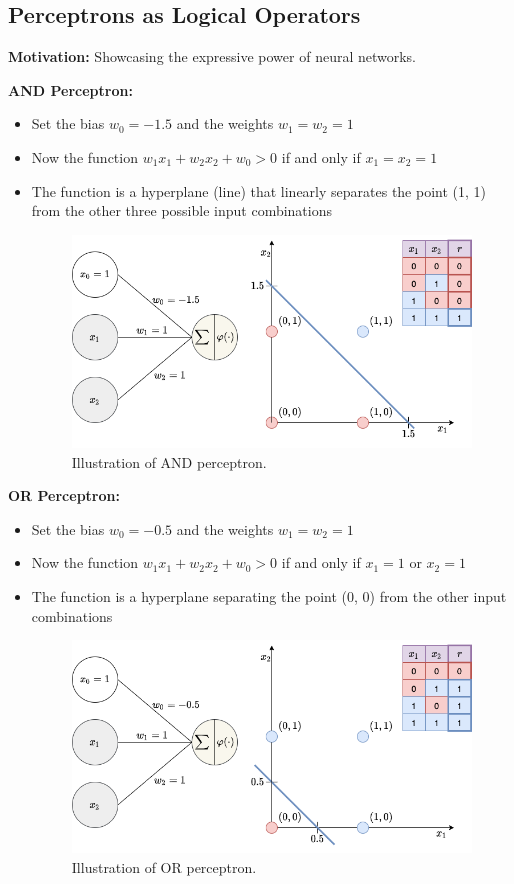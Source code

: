 \documentclass[12pt, a4paper]{article}
\begin{document}
\subsection{Perceptrons as Logical Operators}\label{Perceptrons-as-Logical-Operators}

\textbf{Motivation:} Showcasing the expressive power of neural networks.

\textbf{AND Perceptron:}
\begin{itemize}
  \item Set the bias $w_0 = -1.5$ and the weights $w_1 = w_2 = 1$
  \item Now the function $w_1x_1 + w_2x_2 + w_0 > 0$ if and only if $x_1 = x_2 = 1$
  \item The function is a hyperplane (line) that linearly separates the point (1, 1) from the other three possible input combinations
  \begin{figure}[H]
    \centering
      \includegraphics[width=0.9\columnwidth]{images/and-perceptron.png}
      \caption{Illustration of AND perceptron.}
      \label{fig:and-perceptron}
  \end{figure}
\end{itemize}

\textbf{OR Perceptron:}
\begin{itemize}
  \item Set the bias $w_0 = -0.5$ and the weights $w_1 = w_2 = 1$
  \item Now the function $w_1x_1 + w_2x_2 + w_0 > 0$ if and only if $x_1 = 1$ or $x_2 = 1$
  \item The function is a hyperplane separating the point (0, 0) from the other input combinations
  \begin{figure}[H]
    \centering
      \includegraphics[width=0.9\columnwidth]{images/or-perceptron.png}
      \caption{Illustration of OR perceptron.}
      \label{fig:or-perceptron}
  \end{figure}
\end{itemize}
\end{document}
